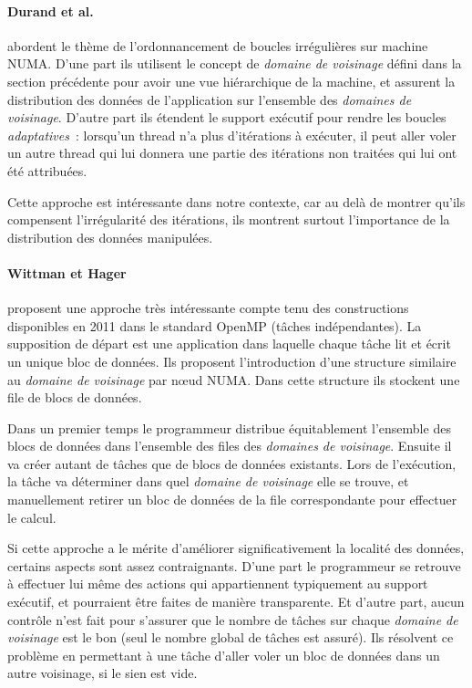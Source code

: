 \paragraph{Durand et al.~\cite{Durand2013}} abordent le thème de l'ordonnancement de boucles irrégulières sur machine NUMA.
D'une part ils utilisent le concept de \emph{domaine de voisinage} défini dans la section précédente pour avoir une vue hiérarchique de la machine, et assurent la distribution des données de l'application sur l'ensemble des \emph{domaines de voisinage}.
D'autre part ils étendent le support exécutif pour rendre les boucles \emph{adaptatives}~: lorsqu'un thread n'a plus d'itérations à exécuter, il peut aller voler un autre thread qui lui donnera une partie des itérations non traitées qui lui ont été attribuées.

Cette approche est intéressante dans notre contexte, car au delà de montrer qu'ils compensent l'irrégularité des itérations, ils montrent surtout l'importance de la distribution des données manipulées.

\paragraph{Wittman et Hager~\cite{Wittmann2011}} proposent une approche très intéressante compte tenu des constructions disponibles en 2011 dans le standard OpenMP (tâches indépendantes).
La supposition de départ est une application dans laquelle chaque tâche lit et écrit un unique bloc de données.
Ils proposent l'introduction d'une structure similaire au \emph{domaine de voisinage} par nœud NUMA.
Dans cette structure ils stockent une file de blocs de données.

Dans un premier temps le programmeur distribue équitablement l'ensemble des blocs de données dans l'ensemble des files des \emph{domaines de voisinage}.
Ensuite il va créer autant de tâches que de blocs de données existants.
Lors de l'exécution, la tâche va déterminer dans quel \emph{domaine de voisinage} elle se trouve, et manuellement retirer un bloc de données de la file correspondante pour effectuer le calcul.

Si cette approche a le mérite d'améliorer significativement la localité des données, certains aspects sont assez contraignants.
D'une part le programmeur se retrouve à effectuer lui même des actions qui appartiennent typiquement au support exécutif, et pourraient être faites de manière transparente.
Et d'autre part, aucun contrôle n'est fait pour s'assurer que le nombre de tâches sur chaque \emph{domaine de voisinage} est le bon (seul le nombre global de tâches est assuré).
Ils résolvent ce problème en permettant à une tâche d'aller voler un bloc de données dans un autre voisinage, si le sien est vide.


